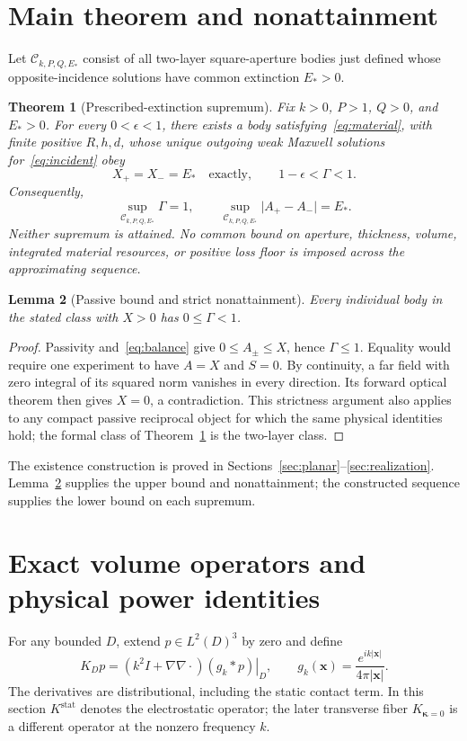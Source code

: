 \documentclass[11pt]{article}
\newtheorem{theorem}{Theorem}[section]
\newtheorem{lemma}[theorem]{Lemma}
\newcommand{\abs}[1]{\lvert #1\rvert}
\begin{document}
\section{Main theorem and nonattainment}\label{sec:main}
Let $\mathcal C_{k,P,Q,E_*}$ consist of all two-layer square-aperture bodies just defined whose opposite-incidence solutions have common extinction $E_*>0$.
\begin{theorem}[Prescribed-extinction supremum]\label{thm:main}
Fix $k>0$, $P>1$, $Q>0$, and $E_*>0$. For every $0<\epsilon<1$, there exists a body satisfying~\eqref{eq:material}, with finite positive $R,h,d$, whose unique outgoing weak Maxwell solutions for~\eqref{eq:incident} obey
\begin{equation}\label{eq:main}
 X_+=X_-=E_*\quad\text{exactly},\qquad 1-\epsilon<\Gamma<1.
\end{equation}
Consequently,
\begin{equation}\label{eq:suprema}
 \sup_{\mathcal C_{k,P,Q,E_*}}\Gamma=1,\qquad
 \sup_{\mathcal C_{k,P,Q,E_*}}\abs{A_+-A_-}=E_*.
\end{equation}
Neither supremum is attained. No common bound on aperture, thickness, volume, integrated material resources, or positive loss floor is imposed across the approximating sequence.
\end{theorem}

\begin{lemma}[Passive bound and strict nonattainment]\label{lem:strict}
Every individual body in the stated class with $X>0$ has $0\leq\Gamma<1$.
\end{lemma}
\begin{proof}
Passivity and~\eqref{eq:balance} give $0\leq A_\pm\leq X$, hence $\Gamma\leq1$. Equality would require one experiment to have $A=X$ and $S=0$. By continuity, a far field with zero integral of its squared norm vanishes in every direction. Its forward optical theorem then gives $X=0$, a contradiction. This strictness argument also applies to any compact passive reciprocal object for which the same physical identities hold; the formal class of Theorem~\ref{thm:main} is the two-layer class.
\end{proof}
The existence construction is proved in Sections~\ref{sec:planar}--\ref{sec:realization}. Lemma~\ref{lem:strict} supplies the upper bound and nonattainment; the constructed sequence supplies the lower bound on each supremum.

\section{Exact volume operators and physical power identities}\label{sec:green}
For any bounded $D$, extend $p\in L^2(D)^3$ by zero and define
\begin{equation}\label{eq:green}
 K_Dp=\left.(k^2I+\nabla\nabla\cdot)(g_k*p)\right|_D,
 \qquad g_k(\mathbf x)=\frac{e^{ik\abs{\mathbf x}}}{4\pi\abs{\mathbf x}}.
\end{equation}
The derivatives are distributional, including the static contact term. In this section $K^{\mathrm{stat}}$ denotes the electrostatic operator; the later transverse fiber $K_{\boldsymbol\kappa=0}$ is a different operator at the nonzero frequency $k$.
\end{document}
